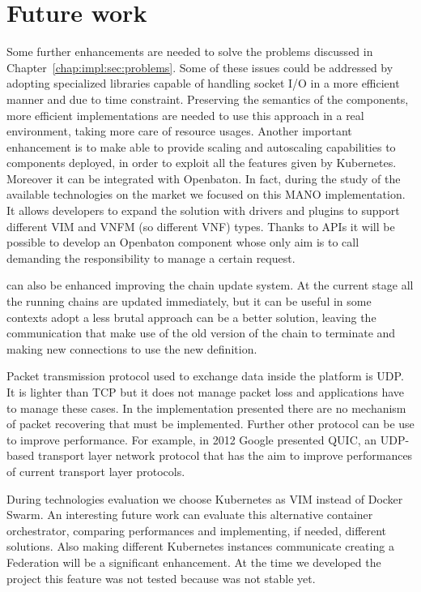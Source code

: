 \chapter{Future work}
\label{chap:future}

Some further enhancements are needed to solve the problems discussed in
Chapter~\ref{chap:impl:sec:problems}. Some of these issues could be addressed
by adopting specialized libraries capable of handling socket I/O in a more
efficient manner and due to time constraint. Preserving the semantics
of the components, more efficient implementations are needed to use this
approach in a real environment, taking more care of resource usages. Another
important enhancement is to make \harbor{} able to provide scaling and
autoscaling capabilities to components deployed, in order to exploit all the
features given by Kubernetes. Moreover it can be integrated with Openbaton. In
fact, during the study of the available technologies on the market we focused
on this MANO implementation. It allows developers to expand the solution with
drivers and plugins to support different VIM and VNFM (so different VNF) types.
Thanks to \harbor{} APIs it will be possible to develop an Openbaton component
whose only aim is to call \harbor{} demanding the responsibility to manage a
certain request.

\harbor{} can also be enhanced improving the chain update system. At the current
stage all the running chains are updated immediately, but it can be useful in
some contexts adopt a less brutal approach can be a better solution, leaving
the communication that make use of the old version of the chain to terminate
and making new connections to use the new definition.

Packet transmission protocol used to exchange data inside the platform is UDP.
It is lighter than TCP but it does not manage packet loss and applications have
to manage these cases. In the implementation presented there are no mechanism of
packet recovering that must be implemented. Further other protocol can be use to
improve performance. For example, in 2012 Google presented QUIC, an UDP-based
transport layer network protocol that has the aim to improve performances of
current transport layer protocols.

During technologies evaluation we choose Kubernetes as VIM instead of Docker
Swarm. An interesting future work can evaluate this alternative container
orchestrator, comparing performances and implementing, if needed, different
solutions. Also making different Kubernetes instances communicate creating
a Federation will be a significant enhancement. At the time we developed the
project this feature was not tested because was not stable yet.


